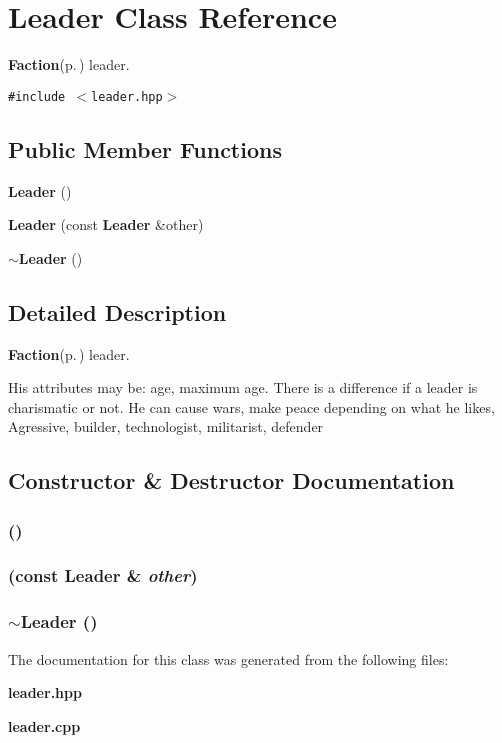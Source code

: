 \section{Leader Class Reference}
\label{classLeader}
{\bf Faction}{\rm (p.\,\pageref{classFaction})} leader.  


{\tt \#include $<$leader.hpp$>$}

\subsection*{Public Member Functions}
\begin{CompactItemize}
\item 
{\bf Leader} ()
\item 
{\bf Leader} (const {\bf Leader} \&other)
\item 
{\bf $\sim$Leader} ()
\end{CompactItemize}


\subsection{Detailed Description}
{\bf Faction}{\rm (p.\,\pageref{classFaction})} leader. 

His attributes may be: age, maximum age. There is a difference if a leader is charismatic or not. He can cause wars, make peace depending on what he likes, Agressive, builder, technologist, militarist, defender



\subsection{Constructor \& Destructor Documentation}
\subsubsection{ ()}\label{classLeader_a0}


\subsubsection{ (const {\bf Leader} \& {\em other})}\label{classLeader_a1}


\subsubsection{\setlength{\rightskip}{0pt plus 5cm}$\sim${\bf Leader} ()}\label{classLeader_a2}




The documentation for this class was generated from the following files:\begin{CompactItemize}
\item 
{\bf leader.hpp}\item 
{\bf leader.cpp}\end{CompactItemize}
